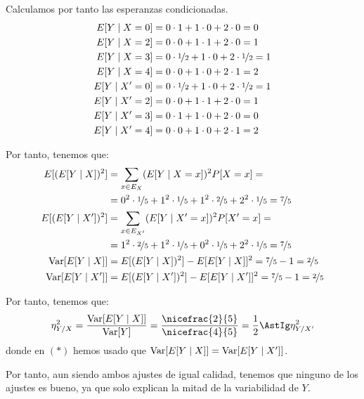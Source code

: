 \begin{ejercicio}
    Calculamos por tanto las esperanzas condicionadas.
    \begin{align*}
        E[Y\mid X = 0] &= 0\cdot 1 + 1\cdot 0 + 2\cdot 0 = 0\\
        E[Y\mid X = 2] &= 0\cdot 0 + 1\cdot 1 + 2\cdot 0 = 1\\
        E[Y\mid X = 3] &= 0\cdot \nicefrac{1}{2} + 1\cdot 0 + 2\cdot \nicefrac{1}{2} = 1\\
        E[Y\mid X = 4] &= 0\cdot 0 + 1\cdot 0 + 2\cdot 1 = 2\\
        E[Y\mid X' = 0] &= 0\cdot \nicefrac{1}{2} + 1\cdot 0 + 2\cdot \nicefrac{1}{2} = 1\\
        E[Y\mid X' = 2] &= 0\cdot 0 + 1\cdot 1 + 2\cdot 0 = 1\\
        E[Y\mid X' = 3] &= 0\cdot 1 + 1\cdot 0 + 2\cdot 0 = 0\\
        E[Y\mid X' = 4] &= 0\cdot 0 + 1\cdot 0 + 2\cdot 1 = 2
    \end{align*}

    Por tanto, tenemos que:
    \begin{align*}
        E[(E[Y\mid X])^2] &= \sum_{x\in E_X} (E[Y\mid X = x])^2 P[X = x]
        =\\&= 0^2\cdot \nicefrac{1}{5} + 1^2\cdot \nicefrac{1}{5} + 1^2\cdot \nicefrac{2}{5} + 2^2\cdot \nicefrac{1}{5} = \nicefrac{7}{5}\\
        E[(E[Y\mid X'])^2] &= \sum_{x\in E_{X'}} (E[Y\mid X' = x])^2 P[X' = x]
        =\\&= 1^2\cdot \nicefrac{2}{5} + 1^2\cdot \nicefrac{1}{5} + 0^2\cdot \nicefrac{1}{5} + 2^2\cdot \nicefrac{1}{5} = \nicefrac{7}{5}\\
        \operatorname{Var}[E[Y\mid X]] &= E[(E[Y\mid X])^2] - E[E[Y\mid X]]^2 = \nicefrac{7}{5} - 1 = \nicefrac{2}{5}\\
        \operatorname{Var}[E[Y\mid X']] &= E[(E[Y\mid X'])^2] - E[E[Y\mid X']]^2 = \nicefrac{7}{5} - 1 = \nicefrac{2}{5}
    \end{align*}

    Por tanto, tenemos que:
    \begin{equation*}
        \eta^2_{Y/X} = \dfrac{\Var[E[Y\mid X]]}{\Var[Y]} = \dfrac{\nicefrac{2}{5}}{\nicefrac{4}{5}} = \frac{1}{2} \AstIg \eta^2_{Y/X'}
    \end{equation*}
    donde en $(\ast)$ hemos usado que $\operatorname{Var}[E[Y\mid X]] = \operatorname{Var}[E[Y\mid X']]$.

    Por tanto, aun siendo ambos ajustes de igual calidad, tenemos que ninguno de los ajustes es bueno, ya que solo explican la mitad de la variabilidad de $Y$.
\end{ejercicio}

